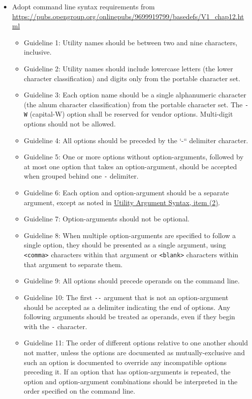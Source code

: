 \documentclass[]{nrel}
\begin{document}
\begin{itemize}
\item Adopt command line syntax requirements from \url{https://pubs.opengroup.org/onlinepubs/9699919799/basedefs/V1\_chap12.html}
\begin{itemize}
\item Guideline 1: Utility names should be between two and nine characters, inclusive.
\item Guideline 2: Utility names should include lowercase letters (the lower character classification) and digits only from the portable character set.
\item Guideline 3: Each option name should be a single alphanumeric character (the alnum character classification) from the portable character set. The \lstinline{-W} (capital-W) option shall be reserved for vendor options. Multi-digit options should not be allowed.
\item Guideline 4: All options should be preceded by the `-`` delimiter character.
\item Guideline 5: One or more options without option-arguments, followed by at most one option that takes an option-argument, should be accepted when grouped behind one \lstinline{-} delimiter.
\item Guideline 6: Each option and option-argument should be a separate argument, except as noted in \href{https://pubs.opengroup.org/onlinepubs/9699919799/basedefs/V1\_chap12.html}{Utility Argument Syntax, item (2)}.
\item Guideline 7: Option-arguments should not be optional.
\item Guideline 8: When multiple option-arguments are specified to follow a single option, they should be presented as a single argument, using \lstinline{<comma>} characters within that argument or \lstinline{<blank>} characters within that argument to separate them.
\item Guideline 9: All options should precede operands on the command line.
\item Guideline 10: The first \lstinline{--} argument that is not an option-argument should be accepted as a delimiter indicating the end of options. Any following arguments should be treated as operands, even if they begin with the \lstinline{-} character.
\item Guideline 11: The order of different options relative to one another should not matter, unless the options are documented as mutually-exclusive and such an option is documented to override any incompatible options preceding it. If an option that has option-arguments is repeated, the option and option-argument combinations should be interpreted in the order specified on the command line.

\end{itemize}
\end{itemize}
\end{document}
